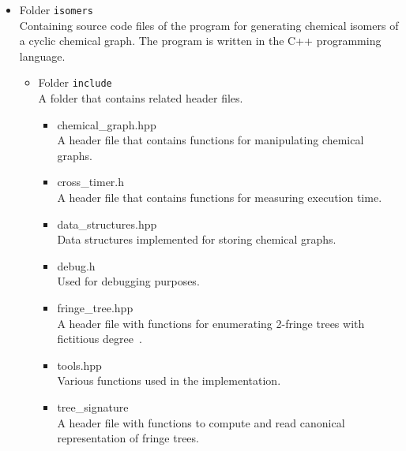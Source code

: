 \documentclass[11pt,titlepage,dvipdfmx,twoside]{article}
\begin{document}
%
\begin{itemize}
\item Folder {\tt isomers}\\
	Containing source code files of the program for generating chemical isomers of a cyclic chemical graph.
	The program is written in the C++ programming language.
	\begin{itemize}
	\item Folder {\tt include}\\
		A folder that contains related header files.
		\begin{itemize}
			\item{chemical\_graph.hpp}\\
			  A header file that contains functions for manipulating 
			  chemical graphs.
			\item{cross\_timer.h}\\
				A header file that contains functions for 
				measuring execution time.
				
			\item{data\_structures.hpp}\\
				Data structures implemented for storing 
				chemical graphs.
				
			\item{debug.h}\\
				Used for debugging purposes.
				
			\item{fringe\_tree.hpp}\\
				A header file with functions for enumerating 
				2-fringe trees with fictitious degree~\cite{branch}.
				
			\item{tools.hpp}\\
				Various functions used in the implementation.
				
			\item{tree\_signature}\\
				A header file with functions to compute and read canonical representation of fringe trees.
					

\end{itemize}
\end{itemize}
\end{itemize}
\end{document}
